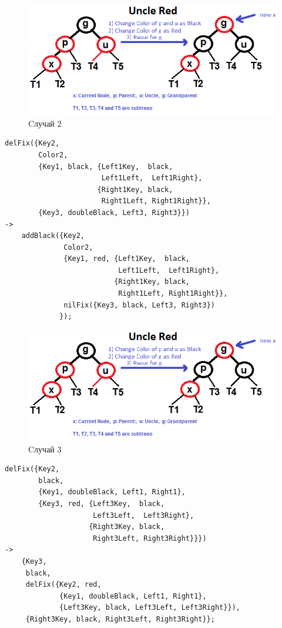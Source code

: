 			\begin{figure}[H]
				\centering
				\includegraphics[width=\textwidth]{img/tan-aus.png}
				\caption{Cлучай 2}
			\end{figure}
			\begin{lstlisting}
delFix({Key2, 														   				
        Color2, 													   				
        {Key1, black, {Left1Key,  black, 
                       Left1Left,  Left1Right}, 	   				
                      {Right1Key, black, 
                       Right1Left, Right1Right}},    				
        {Key3, doubleBlack, Left3, Right3}}) 															   				
->																	   				
    addBlack({Key2, 												   				
              Color2, 											   				
              {Key1, red, {Left1Key,  black, 
                           Left1Left,  Left1Right},  				
                          {Right1Key, black, 
                           Right1Left, Right1Right}},				
              nilFix({Key3, black, Left3, Right3})					   				
             });													   				
			\end{lstlisting}
			
			\begin{figure}[H]
				\centering
				\includegraphics[width=\textwidth]{img/tan-aus.png}
				\caption{Cлучай 3}
			\end{figure}
			\begin{lstlisting}
delFix({Key2, 														   											
        black, 														   				
        {Key1, doubleBlack, Left1, Right1}, 						   				
        {Key3, red, {Left3Key,  black, 
                     Left3Left,  Left3Right}, 	   				
                    {Right3Key, black, 
                     Right3Left, Right3Right}}})															   				
->																	   				
    {Key3, 															   				
     black, 														   				
     delFix({Key2, red, 
             {Key1, doubleBlack, Left1, Right1},    				
             {Left3Key, black, Left3Left, Left3Right}}),			 
     {Right3Key, black, Right3Left, Right3Right}};																				
			\end{lstlisting}
			

